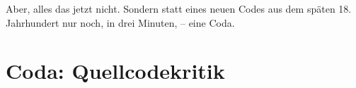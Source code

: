 \documentclass[a4paper,12pt]{article}
\begin{document}
\begin{comment}
(Git's recursive merge implementation also handles other awkward cases, like a file being modified in one version and renamed in the other, but those are extensions to its three-way merge implementation; not part of the technique for finding three versions to merge.)

Recursive three-way merge can only be used in situations where the tool has knowledge about the total ancestry directed acyclic graph (DAG) of the derivatives to be merged. Consequently, it cannot be used in situations where derivatives or merges do not fully specify their parent(s).

\end{comment}

Aber, alles das jetzt nicht. Sondern statt eines neuen Codes aus dem späten 18. Jahrhundert nur noch, in drei Minuten, – eine Coda.

\section*{Coda: Quellcodekritik}


\end{document}
